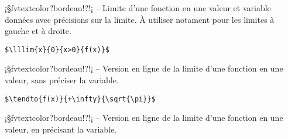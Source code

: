 \documentclass[11pt,a4paper,rgb]{report}
\begin{document}
\setlength{\leftskip}{0pt}
\setlength{\textwidth}{18cm}%


\vspace*{.75cm}

\inCodeStub¡§fvtextcolor?bordeau!?!¡ -- Limite d'une fonction en une valeur et variable données avec précisions sur la limite. À utiliser notament pour les limites à gauche et à droite.

\setlength{\leftskip}{.75cm}%
\setlength{\textwidth}{17.25cm}%

\colorbox{blue!15}{}
\hfill
\begin{minipage}{.65\textwidth}
	\begin{lstlisting}[linewidth=\textwidth, language={[LaTeX]TeX}]
	$\lllim{x}{0}{x>0}{f(x)}$
	\end{lstlisting}
\end{minipage}

\setlength{\leftskip}{0pt}
\setlength{\textwidth}{18cm}%


\vspace*{.75cm}

\inCodeStub¡§fvtextcolor?bordeau!?!¡ -- Version en ligne de la limite d'une fonction en une valeur, sans préciser la variable.

\setlength{\leftskip}{.75cm}%
\setlength{\textwidth}{17.25cm}%

\colorbox{blue!15}{}
\hfill
\begin{minipage}{.65\textwidth}
	\begin{lstlisting}[linewidth=\textwidth, language={[LaTeX]TeX}]
	$\tendto{f(x)}{+\infty}{\sqrt{\pi}}$
	\end{lstlisting}
\end{minipage}

\setlength{\leftskip}{0pt}
\setlength{\textwidth}{18cm}%


\vspace*{.75cm}

\inCodeStub¡§fvtextcolor?bordeau!?!¡ -- Version en ligne de la limite d'une fonction en une valeur, en précisant la variable.
\end{document}
